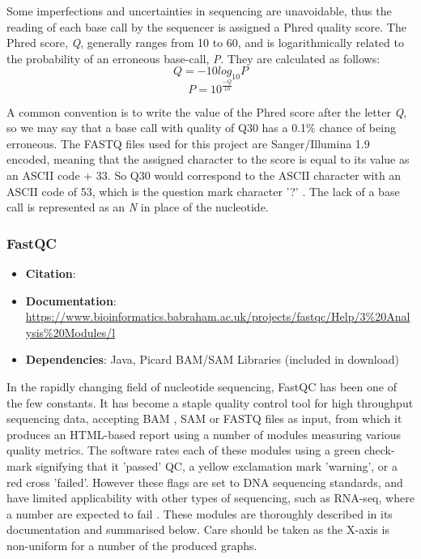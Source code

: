 Some imperfections and uncertainties in sequencing are unavoidable, thus the reading of each base call by the sequencer is assigned a Phred quality score. The Phred score, \textit{Q}, generally ranges from 10 to 60, and is logarithmically related to the probability of an erroneous base-call, \textit{P}\citep{ewing1998base}. They are calculated as follows:
$$ Q = -10 log_{10}P $$
 $$P = 10^{\frac{-Q}{10}}$$

A common convention is to write the value of the Phred score after the letter \textit{Q}, so we may say that a base call with quality of Q30 has a 0.1\% chance of being erroneous. The FASTQ files used for this project are Sanger/Illumina 1.9 encoded, meaning that the assigned character to the score is equal to its value as an ASCII code + 33. So Q30 would correspond to the ASCII character with an ASCII code of 53, which is the question mark character '?' \citep{ewing1998base}. The lack of a base call is represented as an \textit{N} in place of the nucleotide.

\subsubsection{FastQC}
\begin{itemize}\itemsep-0.5em
\item[] \textbf{Citation}: 				\cite{andrews2010fastqc}
\item[] \textbf{Documentation}: 	\url{https://www.bioinformatics.babraham.ac.uk/projects/fastqc/Help/3\%20Analysis\%20Modules/l}
\item[] \textbf{Dependencies}: Java, Picard BAM/SAM Libraries (included in download)
\end{itemize}
In the rapidly changing field of nucleotide sequencing, FastQC has been one of the few constants. It has become a staple quality control tool for high throughput sequencing data, accepting BAM \citep{BAM}, SAM \citep{li2009sequence} or FASTQ files as input, from which it produces an HTML-based report using a number of modules measuring various quality metrics. The software rates each of these modules using a green check-mark signifying that it 'passed' QC, a yellow exclamation mark 'warning', or a red cross 'failed'. However these flags are set to DNA sequencing standards, and have limited applicability with other types of sequencing, such as RNA-seq, where a number are expected to fail \citep{fastqctutorial2021}. These modules are thoroughly described in its documentation and summarised below. Care should be taken as the X-axis is non-uniform for a number of the produced graphs.

